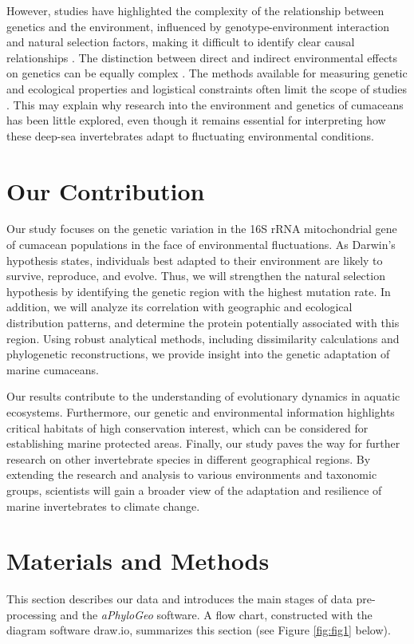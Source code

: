 However, studies have highlighted the complexity of the relationship between genetics and the environment, influenced by genotype-environment interaction and natural selection factors, making it difficult to identify clear causal relationships \citep{balkenhol_identifying_2009}. The distinction between direct and indirect environmental effects on genetics can be equally complex \citep{manel_perspectives_2010, balkenhol_landscape_2019}. The methods available for measuring genetic and ecological properties and logistical constraints often limit the scope of studies \citep{manel_perspectives_2010, shafer_widespread_2013}. This may explain why research into the environment and genetics of cumaceans has been little explored, even though it remains essential for interpreting how these deep-sea invertebrates adapt to fluctuating environmental conditions.

\section{Our Contribution}\label{contribution}

Our study focuses on the genetic variation in the 16S rRNA mitochondrial gene of cumacean populations in the face of environmental fluctuations. As Darwin’s hypothesis states, individuals best adapted to their environment are likely to survive, reproduce, and evolve. Thus, we will strengthen the natural selection hypothesis by identifying the genetic region with the highest mutation rate. In addition, we will analyze its correlation with geographic and ecological distribution patterns, and determine the protein potentially associated with this region. Using robust analytical methods, including dissimilarity calculations and phylogenetic reconstructions, we provide insight into the genetic adaptation of marine cumaceans. 

Our results contribute to the understanding of evolutionary dynamics in aquatic ecosystems. Furthermore, our genetic and environmental information highlights critical habitats of high conservation interest, which can be considered for establishing marine protected areas. Finally, our study paves the way for further research on other invertebrate species in different geographical regions. By extending the research and analysis to various environments and taxonomic groups, scientists will gain a broader view of the adaptation and resilience of marine invertebrates to climate change.

\section{Materials and Methods}\label{materials-methods}
This section describes our data and introduces the main stages of data pre-processing and the \textit{aPhyloGeo} software. A flow chart, constructed with the diagram software draw.io, summarizes this section (see Figure \ref{fig:fig1} below).

